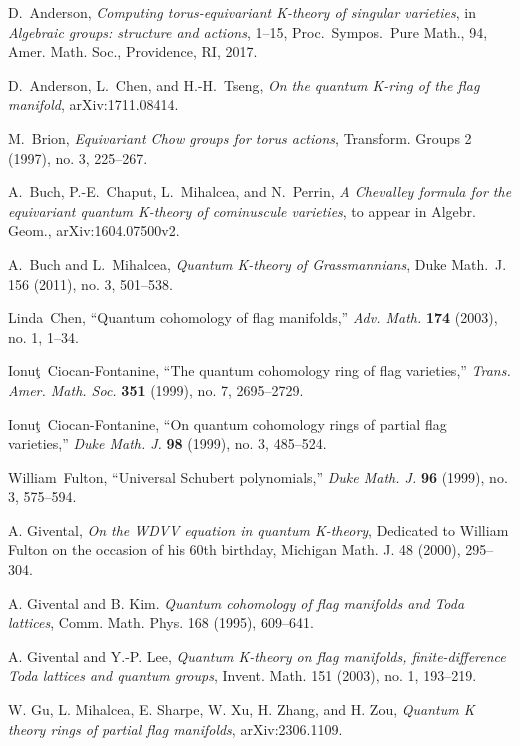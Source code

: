 \documentclass[12pt]{amsart}
\theoremstyle{remark}
\begin{document}
\begin{thebibliography}{12}

 D.~Anderson, {\em Computing torus-equivariant K-theory of singular varieties}, in {\em Algebraic groups: structure and actions}, 1--15, Proc.~Sympos.~Pure Math., 94, Amer. Math. Soc., Providence, RI, 2017.

 D.~Anderson, L.~Chen, and H.-H.~Tseng, {\em On the quantum K-ring of the flag manifold}, arXiv:1711.08414.


 M.~Brion, {\em Equivariant Chow groups for torus actions}, Transform. Groups 2 (1997), no. 3, 225--267.

 A.~Buch, P.-E.~Chaput, L.~Mihalcea, and N.~Perrin, {\em A Chevalley formula for the equivariant quantum K-theory of cominuscule varieties}, to appear in  Algebr. Geom., arXiv:1604.07500v2.

 A.~Buch and L.~Mihalcea, {\em Quantum K-theory of Grassmannians}, Duke Math.~J. 156 (2011), no. 3, 501--538.

 Linda~Chen, ``Quantum cohomology of flag manifolds,'' {\em Adv. Math.} {\bf 174} (2003), no. 1, 1--34.


 Ionu\c{t}~Ciocan-Fontanine, ``The quantum cohomology ring of flag varieties,'' {\em Trans. Amer. Math. Soc.} {\bf 351} (1999), no. 7, 2695--2729.

 Ionu\c{t}~Ciocan-Fontanine, ``On quantum cohomology rings of partial flag varieties,'' {\em Duke Math. J.} {\bf 98} (1999), no. 3, 485--524.

 William~Fulton, ``Universal Schubert polynomials,'' {\em Duke Math. J.} {\bf 96} (1999), no. 3, 575--594.

 A. Givental, {\em On the WDVV equation in quantum K-theory}, Dedicated to William Fulton on the occasion of his 60th birthday, Michigan Math. J. 48 (2000), 295--304.

 A. Givental and B. Kim. {\em Quantum cohomology of flag manifolds and Toda lattices}, Comm. Math. Phys. 168 (1995), 609--641.

 A. Givental and Y.-P. Lee, {\em Quantum K-theory on flag manifolds, finite-difference Toda lattices and quantum groups}, Invent. Math. 151 (2003), no. 1, 193--219.

 W. Gu, L. Mihalcea, E. Sharpe, W. Xu, H. Zhang, and H. Zou, {\em Quantum K theory rings of partial flag manifolds}, arXiv:2306.1109.


\end{thebibliography}
\end{document}
